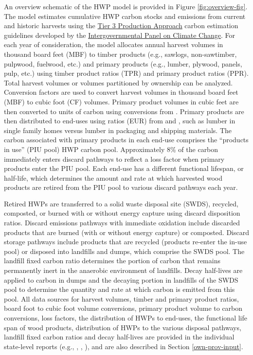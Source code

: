 \documentclass[
  openany]{book}
\begin{document}
An overview schematic of the HWP model is provided in Figure \ref{fig:overview-fig}. The model estimates cumulative HWP carbon stocks and emissions from current and historic harvests using the \href{https://www.ipcc-nggip.iges.or.jp/public/2006gl/pdf/4_Volume4/V4_04_Ch4_Forest_Land.pdf}{Tier 3 Production Approach} carbon estimation guidelines developed by the \href{https://www.ipcc.ch/}{Intergovernmental Panel on Climate Change}. For each year of consideration, the model allocates annual harvest volumes in thousand board feet (MBF) to timber products (e.g., sawlogs, non-sawtimber, pulpwood, fuelwood, etc.) and primary products (e.g., lumber, plywood, panels, pulp, etc.) using timber product ratios (TPR) and primary product ratios (PPR). Total harvest volumes or volumes partitioned by ownership can be analyzed. Conversion factors are used to convert harvest volumes in thousand board feet (MBF) to cubic foot (CF) volumes. Primary product volumes in cubic feet are then converted to units of carbon using conversions from \textcite{smith2006}. Primary products are then distributed to end-uses using ratios (EUR) from \textcite{mckeever2009} and \textcite{mckeever2011}, such as lumber in single family homes versus lumber in packaging and shipping materials. The carbon associated with primary products in each end-use comprises the ``products in use'' (PIU pool) HWP carbon pool. Approximately 8\% of the carbon immediately enters discard pathways to reflect a loss factor when primary products enter the PIU pool. Each end-use has a different functional lifespan, or half-life, which determines the amount and rate at which harvested wood products are retired from the PIU pool to various discard pathways each year.

Retired HWPs are transferred to a solid waste disposal site (SWDS), recycled, composted, or burned with or without energy capture using discard disposition ratios. Discard emissions pathways with immediate oxidation include discarded products that are burned (with or without energy capture) or composted. Discard storage pathways include products that are recycled (products re-enter the in-use pool) or disposed into landfills and dumps, which comprise the SWDS pool. The landfill fixed carbon ratio determines the portion of carbon that remains permanently inert in the anaerobic environment of landfills. Decay half-lives are applied to carbon in dumps and the decaying portion in landfills of the SWDS pool to determine the quantity and rate at which carbon is emitted from this pool. All data sources for harvest volumes, timber and primary product ratios, board foot to cubic foot volume conversions, primary product volume to carbon conversions, loss factors, the distribution of HWPs to end-uses, the functional life span of wood products, distribution of HWPs to the various disposal pathways, landfill fixed carbon ratios and decay half-lives are provided in the individual state-level reports (e.g., \textcite{loeffler2019}, \textcite{morgan2021}, \textcite{nichols2020}), and are also described in Section \ref{own-prov-input}.
\end{document}
